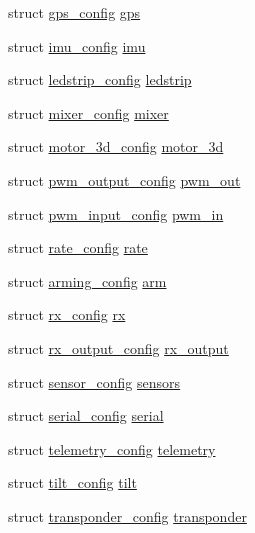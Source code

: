 \begin{DoxyCompactItemize}
\item 
struct \hyperlink{structgps__config}{gps\+\_\+config} \hyperlink{structconfig_a2fbe394304ddf4aee7a8a44dd2b35cf4}{gps}
\item 
struct \hyperlink{structimu__config}{imu\+\_\+config} \hyperlink{structconfig_ac94ca563236e07d70f1e128cb9f060d1}{imu}
\item 
struct \hyperlink{structledstrip__config}{ledstrip\+\_\+config} \hyperlink{structconfig_a48d5a00547ae550bb3e0520e101c236c}{ledstrip}
\item 
struct \hyperlink{structmixer__config}{mixer\+\_\+config} \hyperlink{structconfig_a7f3516dcc2e43f74eccc8fe4ab25f711}{mixer}
\item 
struct \hyperlink{structmotor__3d__config}{motor\+\_\+3d\+\_\+config} \hyperlink{structconfig_a0210c2694683d31fe6116fd5fe91de94}{motor\+\_\+3d}
\item 
struct \hyperlink{structpwm__output__config}{pwm\+\_\+output\+\_\+config} \hyperlink{structconfig_a48eb314ca37d61eeaf60a970c0db241b}{pwm\+\_\+out}
\item 
struct \hyperlink{structpwm__input__config}{pwm\+\_\+input\+\_\+config} \hyperlink{structconfig_ad7fd992c40bec664719fda7077e5c987}{pwm\+\_\+in}
\item 
struct \hyperlink{structrate__config}{rate\+\_\+config} \hyperlink{structconfig_a851b237249e46b47d800f3c9194eb828}{rate}
\item 
struct \hyperlink{structarming__config}{arming\+\_\+config} \hyperlink{structconfig_a2f5e310909b7ea125f33e7e3a43cc3f1}{arm}
\item 
struct \hyperlink{structrx__config}{rx\+\_\+config} \hyperlink{structconfig_a9acc824bd767f37ed6df002784444959}{rx}
\item 
struct \hyperlink{structrx__output__config}{rx\+\_\+output\+\_\+config} \hyperlink{structconfig_ab292df855f721a708b06cbabf1959458}{rx\+\_\+output}
\item 
struct \hyperlink{structsensor__config}{sensor\+\_\+config} \hyperlink{structconfig_ab1c8394a951434b227ee85df71f49222}{sensors}
\item 
struct \hyperlink{structserial__config}{serial\+\_\+config} \hyperlink{structconfig_aad524e924950bbcd340874b4771c1058}{serial}
\item 
struct \hyperlink{structtelemetry__config}{telemetry\+\_\+config} \hyperlink{structconfig_aafdae2411ca629aa312292e781a9b541}{telemetry}
\item 
struct \hyperlink{structtilt__config}{tilt\+\_\+config} \hyperlink{structconfig_a1b2ed80eb598aa9dc8e769ed4f56fe0e}{tilt}
\item 
struct \hyperlink{structtransponder__config}{transponder\+\_\+config} \hyperlink{structconfig_a28f4898d7bd3c254a53d6c2cd93e0b71}{transponder}
\end{DoxyCompactItemize}


